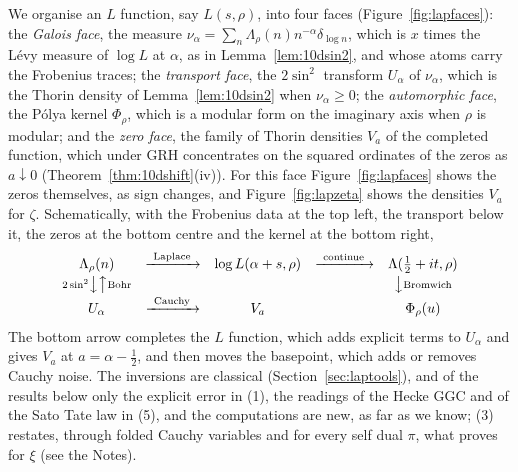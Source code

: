 We organise an $L$ function, say $L(s,\rho)$, into four faces (Figure~\ref{fig:lapfaces}): the \emph{Galois face}, the measure $\nu_\alpha=\sum_n\Lambda_\rho(n)n^{-\alpha}\delta_{\log n}$, which is $x$ times the L\'evy measure of $\log L$ at $\alpha$, as in Lemma~\ref{lem:10dsin2}, and whose atoms carry the Frobenius traces; the \emph{transport face}, the $2\sin^2$ transform $U_\alpha$ of $\nu_\alpha$, which is the Thorin density of Lemma~\ref{lem:10dsin2} when $\nu_\alpha\ge0$; the \emph{automorphic face}, the P\'olya kernel $\Phi_\rho$, which is a modular form on the imaginary axis when $\rho$ is modular; and the \emph{zero face}, the family of Thorin densities $V_a$ of the completed function, which under GRH concentrates on the squared ordinates of the zeros as $a\downarrow0$ (Theorem~\ref{thm:10dshift}(iv)). For this face Figure~\ref{fig:lapfaces} shows the zeros themselves, as sign changes, and Figure~\ref{fig:lapzeta} shows the densities $V_a$ for $\zeta$. Schematically, with the Frobenius data at the top left, the transport below it, the zeros at the bottom centre and the kernel at the bottom right,
\[
\begin{array}{ccccc}
\Lambda_\rho(n) & \xrightarrow{\ \scriptstyle\mathrm{Laplace}\ } & \log L(\alpha+s,\rho) & \xrightarrow{\ \scriptstyle\mathrm{continue}\ } & \Lambda(\tfrac12+it,\rho)\\[2pt]
{\scriptstyle 2\sin^2}\big\downarrow\big\uparrow{\scriptstyle\mathrm{Bohr}} & & & & \big\downarrow{\scriptstyle\mathrm{Bromwich}}\\[2pt]
U_\alpha & \xrightarrow{\ \scriptstyle\mathrm{Cauchy}\ } & V_a & & \Phi_\rho(u)
\end{array}
\]
The bottom arrow completes the $L$ function, which adds explicit terms to $U_\alpha$ and gives $V_a$ at $a=\alpha-\frac12$, and then moves the basepoint, which adds or removes Cauchy noise. The inversions are classical (Section~\ref{sec:laptools}), and of the results below only the explicit error in (1), the readings of the Hecke GGC and of the Sato Tate law in (5), and the computations are new, as far as we know; (3) restates, through folded Cauchy variables and for every self dual $\pi$, what \cite{polson2017} proves for $\xi$ (see the Notes).
